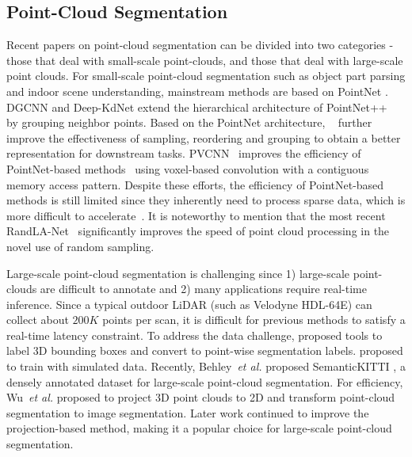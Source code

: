 \documentclass[runningheads]{llncs}
\begin{document}
\subsection{Point-Cloud Segmentation}
Recent papers on point-cloud segmentation can be divided into two categories - those that deal with small-scale point-clouds, and those that deal with large-scale point clouds. For small-scale point-cloud segmentation such as object part parsing and indoor scene understanding, mainstream methods are based on PointNet \cite{qi2017pointnet,qi2017pointnet++}. DGCNN \cite{wang2019dynamic} and Deep-KdNet \cite{klokov2017escape} extend the hierarchical architecture of PointNet++~\cite{qi2017pointnet++} by grouping neighbor points. Based on the PointNet architecture, ~\cite{dovrat2019learning,li2018so,li2018pointcnn} further improve the effectiveness of sampling, reordering and grouping to obtain a better representation for downstream tasks. PVCNN~\cite{liu2019point} improves the efficiency of PointNet-based methods~\cite{liu2019point,wang2019dynamic} using voxel-based convolution with a contiguous memory access pattern. Despite these efforts, the efficiency of PointNet-based methods is still limited since they inherently need to process sparse data, which is more difficult to accelerate~\cite{liu2019point}. It is noteworthy to mention that the most recent RandLA-Net~\cite{hu2019randla} significantly improves the speed of point cloud processing in the novel use of random sampling. 

Large-scale point-cloud segmentation is challenging since 1) large-scale point-clouds are difficult to annotate and 2) many applications require real-time inference. Since a typical outdoor LiDAR (such as Velodyne HDL-64E) can collect about $200K$ points per scan, it is difficult for previous methods \cite{landrieu2018large,riegler2017octnet,tchapmi2017segcloud,liu20173dcnn,rethage2018fully,mo2019partnet,meng2019vv} to satisfy a real-time latency constraint. To address the data challenge, \cite{wu2017squeezeseg,wang2019latte} proposed tools to label 3D bounding boxes and convert to point-wise segmentation labels. \cite{wu2017squeezeseg,wu2018squeezesegv2,yue2018lidar} proposed to train with simulated data. Recently, Behley~\textit{et al.} proposed SemanticKITTI \cite{behley2019iccv}, a densely annotated dataset for large-scale point-cloud segmentation. For efficiency, Wu~\textit{et al.} \cite{wu2017squeezeseg} proposed to project 3D point clouds to 2D and transform point-cloud segmentation to image segmentation. Later work \cite{wu2018squeezesegv2,behley2019iccv,milioto2019rangenet++} continued to improve the projection-based method, making it a popular choice for large-scale point-cloud segmentation. 
\end{document}

